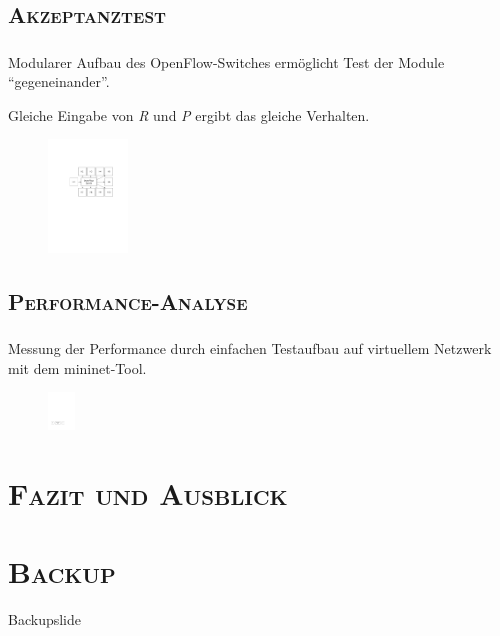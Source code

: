 \documentclass[xcolor=x11names,compress]{beamer}
\renewcommand{\(}{\begin{columns}}
\renewcommand{\)}{\end{columns}}
\newcommand{\<}[1]{\begin{column}{#1}}
\renewcommand{\>}{\end{column}}
\begin{document}
\subsection{\scshape Akzeptanztest}
\begin{frame}
  \frametitle{\insertsubsection}
  Modularer Aufbau des OpenFlow-Switches ermöglicht Test der Module \enquote{gegeneinander}.
  \begin{tcolorbox}[colback=blue!5!white,colframe=blue!75!black,title=Annahme,drop fuzzy shadow]
    Gleiche Eingabe von \textit{R} und \textit{P} ergibt das gleiche Verhalten.
  \end{tcolorbox}
  \begin{figure}
  \centering
  \includegraphics[height=3cm]{figures/ofswitch-acctest}
  \end{figure}
\end{frame}

\subsection{\scshape Performance-Analyse}
\begin{frame}
  \frametitle{\insertsubsection}
  Messung der Performance durch einfachen Testaufbau auf virtuellem Netzwerk mit dem \textsf{mininet}-Tool.
  \begin{figure}
  \centering
  \includegraphics[height=1cm]{figures/ofswitch-perftest}
  \end{figure}
\end{frame}

\section{\scshape Fazit und Ausblick}
\begin{frame}
\end{frame}

\appendix
\section{\scshape Backup}
\begin{frame}[noframenumbering]
Backupslide
\end{frame}
\end{document}
